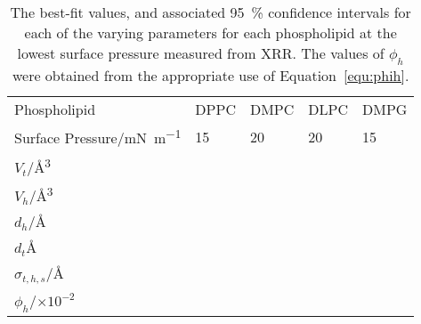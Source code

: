 \begin{table}
    \centering
    \small
    \caption{The best-fit values, and associated \SI{95}{\percent} confidence intervals for each of the varying parameters for each phospholipid at the lowest surface pressure measured from XRR. The values of $\phi_h$ were obtained from the appropriate use of Equation~\ref{equ:phih}.}
    \label{tab:xrrref1}
    \begin{tabular}{l | l l l l}
        \toprule
        Phospholipid & DPPC & DMPC & DLPC & DMPG \\
        Surface Pressure/\si{\milli\newton\per\meter} & 15 & 20 & 20 & 15 \\
        \midrule
        $V_t$/\si{\angstrom\cubed} &  &  &  &  \\
        $V_h$/\si{\angstrom\cubed} &  &  &  &  \\
        $d_h$/\si{\angstrom} &  &  &  &  \\
        \midrule
        $d_t$\si{\angstrom} &  &  &  &  \\
        $\sigma_{t,h,s}$/\si{\angstrom} &  &  &  &  \\
        \midrule
        $\phi_h$/$\times 10^{-2}$ &  &  &  &  \\
        \bottomrule
    \end{tabular}
\end{table}
